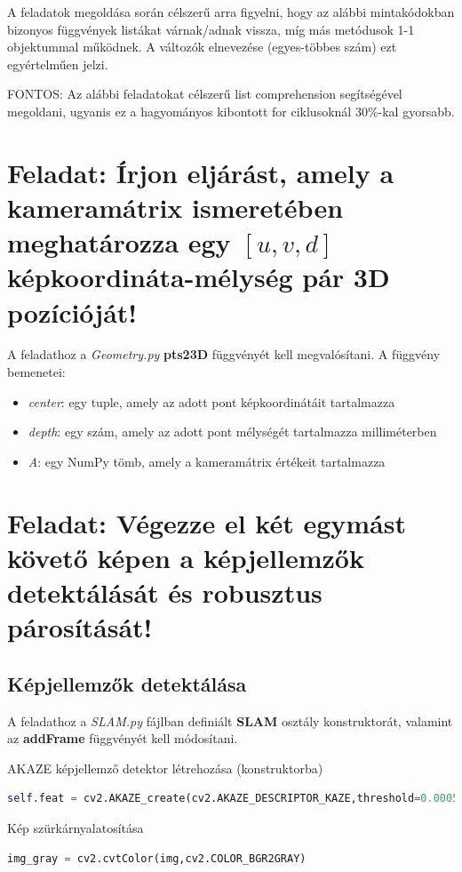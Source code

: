 \documentclass[12pt,a4paper,oneside]{report}             %
\begin{document}
A feladatok megoldása során célszerű arra figyelni, hogy az alábbi mintakódokban bizonyos függvények listákat várnak/adnak vissza, míg más metódusok 1-1 objektummal működnek. A változók elnevezése (egyes-többes szám) ezt egyértelműen jelzi.

FONTOS: Az alábbi feladatokat célszerű list comprehension segítségével megoldani, ugyanis ez a hagyományos kibontott for ciklusoknál 30\%-kal gyorsabb.

\section{Feladat: Írjon eljárást, amely a kameramátrix ismeretében meghatározza egy $[u, v, d]$ képkoordináta-mélység pár 3D pozícióját!}

A feladathoz a \emph{Geometry.py} \textbf{pts23D} függvényét kell megvalósítani. A függvény bemenetei: 
\begin{itemize}
\item \emph{center}: egy tuple, amely az adott pont képkoordinátáit tartalmazza
\item \emph{depth}: egy szám, amely az adott pont mélységét tartalmazza milliméterben
\item \emph{A}: egy NumPy tömb, amely a kameramátrix értékeit tartalmazza
\end{itemize}

\section{Feladat: Végezze el két egymást követő képen a képjellemzők detektálását és robusztus párosítását!}

\subsection{Képjellemzők detektálása}

A feladathoz a \emph{SLAM.py} fájlban definiált \textbf{SLAM} osztály konstruktorát, valamint az \textbf{addFrame} függvényét kell módosítani.

AKAZE képjellemző detektor létrehozása (konstruktorba)

\begin{lstlisting}[language=Python]
self.feat = cv2.AKAZE_create(cv2.AKAZE_DESCRIPTOR_KAZE,threshold=0.0005)
\end{lstlisting}

Kép szürkárnyalatosítása

\begin{lstlisting}[language=Python]
img_gray = cv2.cvtColor(img,cv2.COLOR_BGR2GRAY)
\end{lstlisting}
\end{document}
